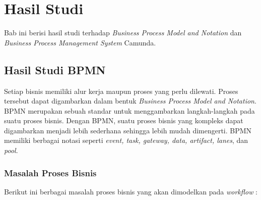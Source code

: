 \chapter{Hasil Studi}
\label{chap:studi}
Bab ini berisi hasil studi terhadap \textit{Business Process Model and Notation} dan \textit{Business Process Management System} Camunda. 

\section{Hasil Studi BPMN}
\label{sec:studibpmn}
Setiap bisnis memiliki alur kerja maupun proses yang perlu dilewati. Proses tersebut dapat digambarkan dalam bentuk \textit{Business Process Model and Notation}. BPMN merupakan sebuah standar untuk menggambarkan langkah-langkah pada suatu proses bisnis. Dengan BPMN, suatu proses bisnis yang kompleks dapat digambarkan menjadi lebih sederhana sehingga lebih mudah dimengerti. BPMN memiliki berbagai notasi seperti \textit{event, task, gateway, data, artifact, lanes}, dan \textit{pool}.  



\subsection{Masalah Proses Bisnis}
\label{masalah}
Berikut ini berbagai masalah proses bisnis yang akan dimodelkan pada \textit{workflow} :

